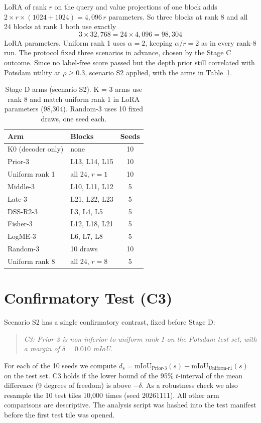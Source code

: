 \documentclass[11pt,a4paper]{report}
\begin{document}
LoRA of rank $r$ on the query and value projections of one block adds $2 \times r \times (1024 + 1024) = 4{,}096\,r$ parameters. So three blocks at rank 8 and all 24 blocks at rank 1 both use exactly
\begin{equation}
    3 \times 32{,}768 = 24 \times 4{,}096 = 98{,}304
\end{equation}
LoRA parameters. Uniform rank 1 uses $\alpha = 2$, keeping $\alpha/r = 2$ as in every rank-8 run. The protocol fixed three scenarios in advance, chosen by the Stage C outcome. Since no label-free score passed but the depth prior still correlated with Potsdam utility at $\rho \geq 0.3$, scenario S2 applied, with the arms in Table~\ref{tab:arms}.

\begin{table}[t]
\centering
\caption{Stage D arms (scenario S2). K = 3 arms use rank 8 and match uniform rank 1 in LoRA parameters (98,304). Random-3 uses 10 fixed draws, one seed each.}
\label{tab:arms}
\small
\setlength{\tabcolsep}{4pt}
\begin{tabular}{@{}llc@{}}
\toprule
\textbf{Arm} & \textbf{Blocks} & \textbf{Seeds} \\
\midrule
K0 (decoder only) & none & 10 \\
Prior-3 & L13, L14, L15 & 10 \\
Uniform rank 1 & all 24, $r = 1$ & 10 \\
Middle-3 & L10, L11, L12 & 5 \\
Late-3 & L21, L22, L23 & 5 \\
DSS-R2-3 & L3, L4, L5 & 5 \\
Fisher-3 & L12, L18, L21 & 5 \\
LogME-3 & L6, L7, L8 & 5 \\
Random-3 & 10 draws & 10 \\
Uniform rank 8 & all 24, $r = 8$ & 5 \\
\bottomrule
\end{tabular}
\end{table}

\section{Confirmatory Test (C3)}

Scenario S2 has a single confirmatory contrast, fixed before Stage D:
\begin{quote}
\textit{C3: Prior-3 is non-inferior to uniform rank 1 on the Potsdam test set, with a margin of $\delta = 0.010$ mIoU.}
\end{quote}
For each of the 10 seeds we compute $d_s = \text{mIoU}_{\text{Prior-3}}(s) - \text{mIoU}_{\text{Uniform-r1}}(s)$ on the test set. C3 holds if the lower bound of the 95\% $t$-interval of the mean difference (9 degrees of freedom) is above $-\delta$. As a robustness check we also resample the 10 test tiles 10,000 times (seed 20261111). All other arm comparisons are descriptive. The analysis script was hashed into the test manifest before the first test tile was opened.
\end{document}
